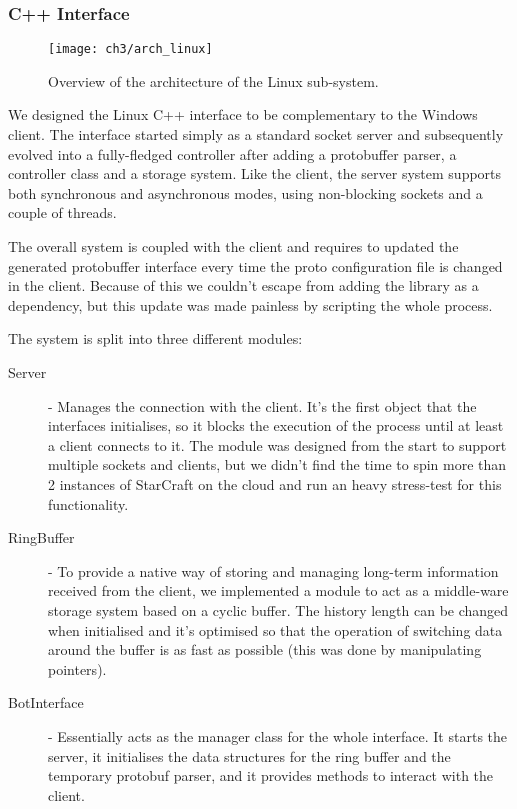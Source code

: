 \subsubsection{C++ Interface}

\begin{figure}[h]
    \centering
    \texttt{[image: ch3/arch\_linux]}
    \caption{Overview of the architecture of the Linux sub-system.}
    \label{fig:arch_linux}
\end{figure}

We designed the Linux C++ interface to be complementary to the Windows client.
The interface started simply as a standard socket server and subsequently
evolved into a fully-fledged controller after adding a protobuffer parser, a
controller class and a storage system. Like the client, the server system
supports both synchronous and asynchronous modes, using non-blocking sockets and
a couple of threads.

The overall system is coupled with the client and requires to updated the
generated protobuffer interface every time the proto configuration file is
changed in the client. Because of this we couldn't escape from adding the
library as a dependency, but this update was made painless by scripting the
whole process.

The system is split into three different modules:
\begin{description}
\item [Server] - Manages the connection with the client. It's the first object
  that the interfaces initialises, so it blocks the execution of the process
  until at least a client connects to it. The module was designed from the start
  to support multiple sockets and clients, but we didn't find the time to spin
  more than 2 instances of StarCraft on the cloud and run an heavy stress-test
  for this functionality.
\item [RingBuffer] - To provide a native way of storing and managing long-term
  information received from the client, we implemented a module to act as a
  middle-ware storage system based on a cyclic buffer. The history length can be
  changed when initialised and it's optimised so that the operation of switching
  data around the buffer is as fast as possible (this was done by manipulating
  pointers).
\item [BotInterface] - Essentially acts as the manager class for the whole interface.
  It starts the server, it initialises the data structures for the ring buffer
  and the temporary protobuf parser, and it provides methods to interact with
  the client.
\end{description}

